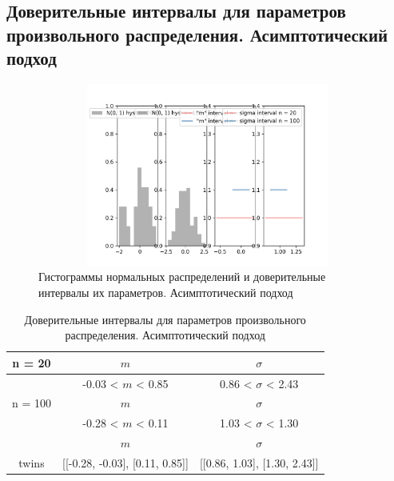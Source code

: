 \documentclass[main.tex]{subfiles}
\begin{document}
\subsection{Доверительные интервалы для параметров произвольного распределения. Асимптотический подход}
\begin{figure}[ht]
	\centering
	\includegraphics[width = 18cm, height = 6cm]{../images/interval/8_2.png}
	\caption{Гистограммы нормальных распределений и доверительные интервалы их параметров. Асимптотический подход}
	\label{w_pert2}
\end{figure}

\begin{table}[ht]
	\centering
	\begin{tabular}{| c | c | c |}
		\hline
		n = 20   &  $m$  & $\sigma$\\ \hline
		&  -0.03 < $m$ < 0.85 & 0.86 < $\sigma$ < 2.43 \\ \hline
		n = 100   &  $m$  & $\sigma$\\ \hline
		& -0.28 < $m$ < 0.11 & 1.03 < $\sigma$ < 1.30 \\ \hline
		&  $m$ & $\sigma$\\ \hline
		twins & [[-0.28, -0.03], [0.11, 0.85]] & [[0.86, 1.03], [1.30, 2.43]] \\
		\hline
	\end{tabular}
	\caption{Доверительные интервалы для параметров произвольного распределения. Асимптотический подход}
	\label{tab:interv_asimpt}
\end{table}

\newpage
\end{document}
